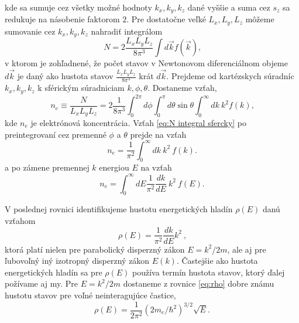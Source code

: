kde sa sumuje cez všetky možné hodnoty ${k_x, k_y, k_z}$ dané vyššie a suma cez ${s_z}$ sa redukuje na násobenie faktorom $2$. Pre dostatočne veľké ${L_x, L_y, L_z}$ môžeme sumovanie cez
${k_x, k_y, k_z}$ nahradiť integrálom
\begin{equation}
 \label{eq:N integral}
 N = 2 \frac{L_xL_yL_z}{8\pi^3} \int d \vec k f(\vec k)  \text{,}
\end{equation}
v ktorom je zohľadnené, že počet stavov v Newtonovom diferenciálnom objeme $d \vec k$ je daný ako hustota stavov $\frac{L_xL_yL_z}{8\pi^3}$ krát $d \vec k$.
Prejdeme od kartézskych súradníc ${k_x, k_y, k_z}$ k sférickým súradniciam ${k, \phi, \theta}$. Dostaneme vzťah,
\begin{equation}
 \label{eq:N integral sfercky}
 n_e \equiv \frac{N}{L_xL_yL_z} = 2 \frac{1}{8\pi^3} \int_0^{2\pi} d\phi \int_0^{\pi}  d\theta \sin{\theta} \int_0^{\infty} dk\ k^2 f(k)  \text{,}
\end{equation}
kde $n_e$ je elektrónová koncentrácia. Vzťah  \eqref{eq:N integral sfercky} po preintegrovaní cez premenné $\phi$ a $\theta$ prejde na vzťah
\begin{equation}
 \label{eq:N integral sfer k}
 n_e =   \frac{1}{\pi^2} \int_0^{\infty} dk \ k^2 \ f(k)  \text{.}
\end{equation}
a po zámene premennej $k$ energiou $E$ na vzťah
\begin{equation}
 \label{eq:N integral sfer energ}
 n_e =   \int_0^{\infty} dE \frac{1}{\pi^2}  \frac{dk}{dE} \ k^2 \ f(E)  \text{.}
\end{equation}

V poslednej rovnici identifikujeme hustotu energetických hladín $\rho(E)$ danú vzťahom
\begin{equation}
\label{eq:rho}
 \rho(E)=\frac{1}{\pi^2} \frac{dk}{dE} k^2  \ \text{,}
\end{equation}
ktorá platí nielen pre parabolický disperzný zákon $E = k^2/2m$, ale aj pre ľubovoľný iný izotropný disperzný zákon $E(k)$. 
Častejšie ako hustota energetických hladín sa pre $\rho(E)$ používa termín hustota stavov, ktorý ďalej požívame aj my. 
Pre $E = k^2/2m$ dostaneme z rovnice \eqref{eq:rho}
dobre známu hustotu stavov pre voľné neinteragujúce častice,
\begin{equation}
 \label{eq:rho_par}
 \rho(E)=\frac{1}{2\pi^2}{(2 m_e/\hbar^2)}^{3/2} \sqrt{E} \text{.}
\end{equation}


